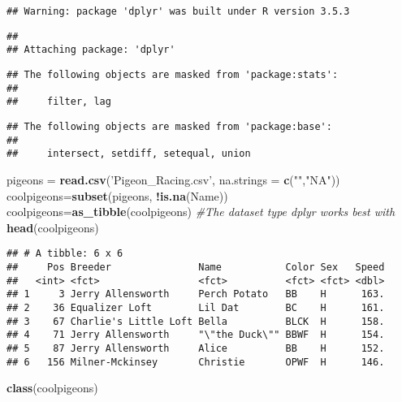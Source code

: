 \documentclass[]{article}
\newenvironment{Shaded}{\begin{snugshade}}{\end{snugshade}}
\newcommand{\KeywordTok}[1]{\textcolor[rgb]{0.13,0.29,0.53}{\textbf{#1}}}
\newcommand{\DataTypeTok}[1]{\textcolor[rgb]{0.13,0.29,0.53}{#1}}
\newcommand{\StringTok}[1]{\textcolor[rgb]{0.31,0.60,0.02}{#1}}
\newcommand{\CommentTok}[1]{\textcolor[rgb]{0.56,0.35,0.01}{\textit{#1}}}
\newcommand{\OperatorTok}[1]{\textcolor[rgb]{0.81,0.36,0.00}{\textbf{#1}}}
\newcommand{\NormalTok}[1]{#1}
\begin{document}
\begin{verbatim}
## Warning: package 'dplyr' was built under R version 3.5.3
\end{verbatim}

\begin{verbatim}
## 
## Attaching package: 'dplyr'
\end{verbatim}

\begin{verbatim}
## The following objects are masked from 'package:stats':
## 
##     filter, lag
\end{verbatim}

\begin{verbatim}
## The following objects are masked from 'package:base':
## 
##     intersect, setdiff, setequal, union
\end{verbatim}

\begin{Shaded}
\begin{Highlighting}[]
\NormalTok{pigeons =}\StringTok{ }\KeywordTok{read.csv}\NormalTok{(}\StringTok{'Pigeon_Racing.csv'}\NormalTok{, }\DataTypeTok{na.strings =} \KeywordTok{c}\NormalTok{(}\StringTok{""}\NormalTok{,}\StringTok{"NA"}\NormalTok{))}
\NormalTok{coolpigeons=}\KeywordTok{subset}\NormalTok{(pigeons, }\OperatorTok{!}\KeywordTok{is.na}\NormalTok{(Name))}
\NormalTok{coolpigeons=}\KeywordTok{as_tibble}\NormalTok{(coolpigeons) }\CommentTok{#The dataset type dplyr works best with}
\KeywordTok{head}\NormalTok{(coolpigeons)}
\end{Highlighting}
\end{Shaded}

\begin{verbatim}
## # A tibble: 6 x 6
##     Pos Breeder               Name           Color Sex   Speed
##   <int> <fct>                 <fct>          <fct> <fct> <dbl>
## 1     3 Jerry Allensworth     Perch Potato   BB    H      163.
## 2    36 Equalizer Loft        Lil Dat        BC    H      161.
## 3    67 Charlie's Little Loft Bella          BLCK  H      158.
## 4    71 Jerry Allensworth     "\"the Duck\"" BBWF  H      154.
## 5    87 Jerry Allensworth     Alice          BB    H      152.
## 6   156 Milner-Mckinsey       Christie       OPWF  H      146.
\end{verbatim}

\begin{Shaded}
\begin{Highlighting}[]
\KeywordTok{class}\NormalTok{(coolpigeons)}
\end{Highlighting}
\end{Shaded}
\end{document}
